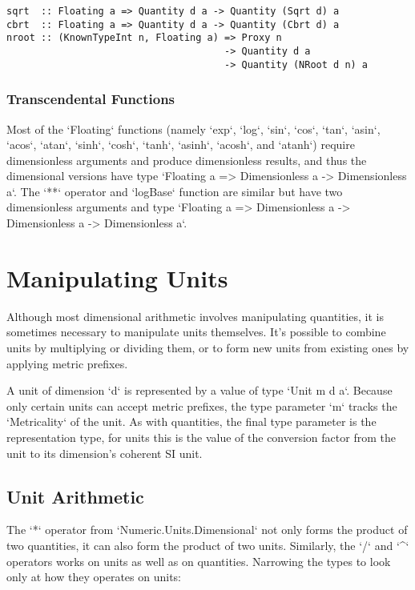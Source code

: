 \documentclass[11pt]{report}
\begin{document}
\begin{lstlisting}
sqrt  :: Floating a => Quantity d a -> Quantity (Sqrt d) a
cbrt  :: Floating a => Quantity d a -> Quantity (Cbrt d) a
nroot :: (KnownTypeInt n, Floating a) => Proxy n
                                      -> Quantity d a
                                      -> Quantity (NRoot d n) a
\end{lstlisting}

\subsection{Transcendental Functions}

Most of the `Floating` functions (namely `exp`, `log`, `sin`, `cos`, `tan`, `asin`, `acos`, `atan`, `sinh`, `cosh`, `tanh`, `asinh`, `acosh`, and `atanh`)
require dimensionless arguments and produce dimensionless results, and thus the dimensional versions have type `Floating a => Dimensionless a -> Dimensionless a`.
The `**` operator and `logBase` function are similar but have two dimensionless arguments and type `Floating a => Dimensionless a -> Dimensionless a -> Dimensionless a`.





\chapter{Manipulating Units}

Although most dimensional arithmetic involves manipulating quantities, it is sometimes necessary
to manipulate units themselves. It's possible to combine units by multiplying or dividing them, or to
form new units from existing ones by applying metric prefixes.

A unit of dimension `d` is represented by a value of type `Unit m d a`. Because only certain units can
accept metric prefixes, the type parameter `m` tracks the `Metricality` of the unit. As with quantities,
the final type parameter is the representation type, for units this is the value of the conversion factor
from the unit to its dimension's coherent SI unit.

\section{Unit Arithmetic}

The `*` operator from `Numeric.Units.Dimensional` not only forms the product of two quantities, it can also
form the product of two units. Similarly, the `/` and `^` operators works on units as well as on quantities.
Narrowing the types to look only at how they operates on units:
\end{document}
